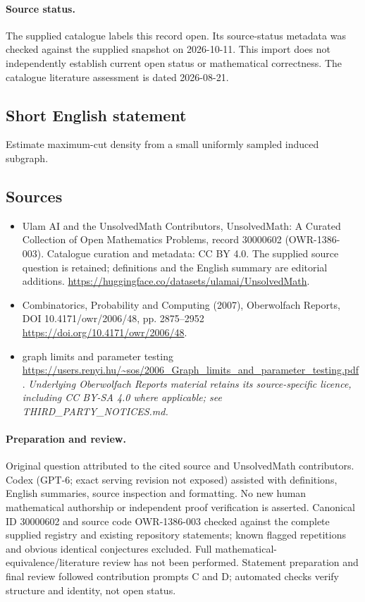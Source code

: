 \documentclass[11pt]{article}
\begin{document}
\paragraph{Source status.}
The supplied catalogue labels this record open. Its source-status metadata was checked against the supplied snapshot on 2026-10-11. This import does not independently establish current open status or mathematical correctness. The catalogue literature assessment is dated 2026-08-21.
\subsection{Short English statement}
Estimate maximum-cut density from a small uniformly sampled induced subgraph.
\subsection{Sources}
\begin{itemize}
\item[S1] Ulam AI and the UnsolvedMath Contributors, UnsolvedMath: A Curated Collection of Open Mathematics Problems, record 30000602 (OWR-1386-003). Catalogue curation and metadata: CC BY 4.0. The supplied source question is retained; definitions and the English summary are editorial additions.
\url{https://huggingface.co/datasets/ulamai/UnsolvedMath}.
\item[S2] Combinatorics, Probability and Computing (2007), Oberwolfach Reports, DOI 10.4171/owr/2006/48, pp. 2875--2952
\url{https://doi.org/10.4171/owr/2006/48}.
\item[S3] graph limits and parameter testing
\url{https://users.renyi.hu/~sos/2006_Graph_limits_and_parameter_testing.pdf}.
\textit{Underlying Oberwolfach Reports material retains its source-specific licence, including CC BY-SA 4.0 where applicable; see THIRD\_PARTY\_NOTICES.md.}
\end{itemize}
\paragraph{Preparation and review.}
Original question attributed to the cited source and UnsolvedMath contributors. Codex (GPT-6; exact serving revision not exposed) assisted with definitions, English summaries, source inspection and formatting. No new human mathematical authorship or independent proof verification is asserted. Canonical ID 30000602 and source code OWR-1386-003 checked against the complete supplied registry and existing repository statements; known flagged repetitions and obvious identical conjectures excluded. Full mathematical-equivalence/literature review has not been performed. Statement preparation and final review followed contribution prompts C and D; automated checks verify structure and identity, not open status.
\label{end:30000602}
\end{document}
